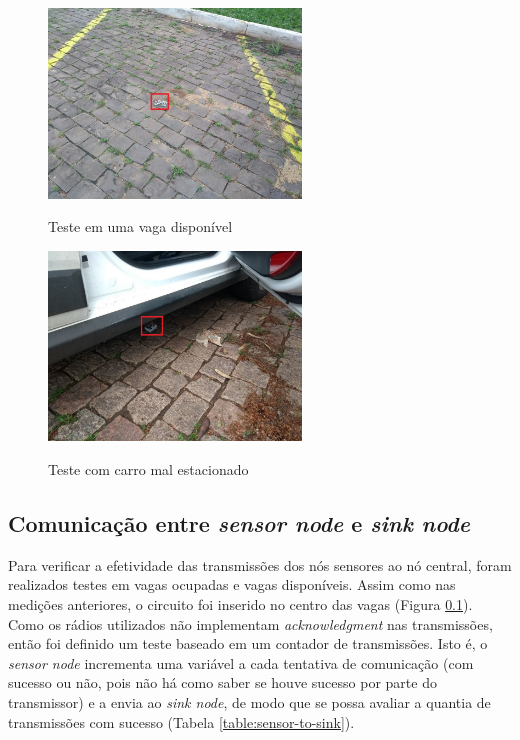 \documentclass[oneside,openright,12pt]{ufsm_2015} %
\begin{document}
    \begin{figure}[ht]
     	    \caption{\label{exepretex} Teste em uma vaga disponível}
            \centering
            \includegraphics[width=0.6\textwidth]{figuras/disponivel.jpg}
            \vspace{\baselineskip} %
            \label{fig:disponivel}
    \end{figure}
    
    \begin{figure}[ht]
     	    \caption{\label{exepretex} Teste com carro mal estacionado}
            \centering
            \includegraphics[width=0.6\textwidth]{figuras/mal-estacionado.jpg}
            \vspace{\baselineskip} %
            \label{fig:mal-estacionado}
    \end{figure}
    
    \subsection{Comunicação entre \textit{sensor node} e \textit{sink node}}
    Para verificar a efetividade das transmissões dos nós sensores ao nó central, foram realizados testes em vagas ocupadas e vagas disponíveis. Assim como nas medições anteriores, o circuito foi inserido no centro das vagas (Figura \ref{}). Como os rádios utilizados não implementam \textit{acknowledgment} nas transmissões, então foi definido um teste baseado em um contador de transmissões. Isto é, o \textit{sensor node} incrementa uma variável a cada tentativa de comunicação (com sucesso ou não, pois não há como saber se houve sucesso por parte do transmissor) e a envia ao \textit{sink node}, de modo que se possa avaliar a quantia de transmissões com sucesso (Tabela \ref{table:sensor-to-sink}).
    
\end{document}
